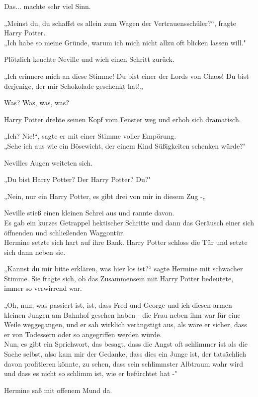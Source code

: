 {Das... machte sehr viel Sinn.

„Meinst du, du schaffst es allein zum Wagen der Vertrauensschüler?“, fragte Harry Potter.\\ „Ich habe so meine Gründe, warum ich mich nicht allzu oft blicken lassen will."

Plötzlich keuchte Neville und wich einen Schritt zurück.

„Ich erinnere mich an diese Stimme! Du bist einer der Lords von Chaos! Du bist derjenige, der mir Schokolade geschenkt hat!„

Was? Was, was, was?

Harry Potter drehte seinen Kopf vom Fenster weg und erhob sich dramatisch.

„Ich? Nie!“, sagte er mit einer Stimme voller Empörung.\\ „Sehe ich aus wie ein Bösewicht, der einem Kind Süßigkeiten schenken würde?"

Nevilles Augen weiteten sich.

„Du bist Harry Potter? Der Harry Potter? Du?"

„Nein, nur ein Harry Potter, es gibt drei von mir in diesem Zug -„

Neville stieß einen kleinen Schrei aus und rannte davon.\\ Es gab ein kurzes Getrappel hektischer Schritte und dann das Geräusch einer sich öffnenden und schließenden Waggontür.\\ Hermine setzte sich hart auf ihre Bank. Harry Potter schloss die Tür und setzte sich dann neben sie.

„Kannst du mir bitte erklären, was hier los ist?“ sagte Hermine mit schwacher Stimme. Sie fragte sich, ob das Zusammensein mit Harry Potter bedeutete, immer so verwirrend war.

„Oh, nun, was passiert ist, ist, dass Fred und George und ich diesen armen kleinen Jungen am Bahnhof gesehen haben - die Frau neben ihm war für eine Weile weggegangen, und er sah wirklich verängstigt aus, als wäre er sicher, dass er von Todessern oder so angegriffen werden würde.\\ Nun, es gibt ein Sprichwort, das besagt, dass die Angst oft schlimmer ist als die Sache selbst, also kam mir der Gedanke, dass dies ein Junge ist, der tatsächlich davon profitieren könnte, zu sehen, dass sein schlimmster Albtraum wahr wird und dass es nicht so schlimm ist, wie er befürchtet hat -"

Hermine saß mit offenem Mund da.

}
